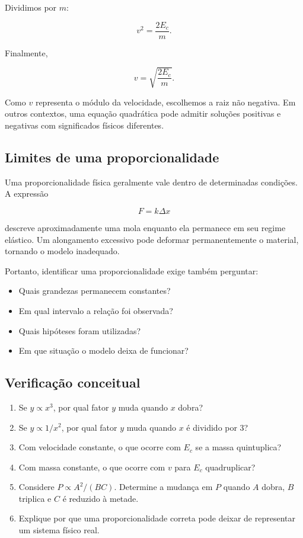 Dividimos por $m$:

\begin{equation}
  v^2=\frac{2E_c}{m}.
\end{equation}

Finalmente,

\begin{equation}
  v=\sqrt{\frac{2E_c}{m}}.
\end{equation}

Como $v$ representa o módulo da velocidade, escolhemos a raiz não negativa. Em outros contextos, uma equação quadrática pode admitir soluções positivas e negativas com significados físicos diferentes.

\subsection{Limites de uma proporcionalidade}

Uma proporcionalidade física geralmente vale dentro de determinadas condições. A expressão

\begin{equation}
  F=k\Delta x
\end{equation}

descreve aproximadamente uma mola enquanto ela permanece em seu regime elástico. Um alongamento excessivo pode deformar permanentemente o material, tornando o modelo inadequado.

Portanto, identificar uma proporcionalidade exige também perguntar:

\begin{itemize}
  \item Quais grandezas permanecem constantes?
  \item Em qual intervalo a relação foi observada?
  \item Quais hipóteses foram utilizadas?
  \item Em que situação o modelo deixa de funcionar?
\end{itemize}

\subsection*{Verificação conceitual}

\begin{enumerate}
  \item Se $y\propto x^3$, por qual fator $y$ muda quando $x$ dobra?
  \item Se $y\propto1/x^2$, por qual fator $y$ muda quando $x$ é dividido por 3?
  \item Com velocidade constante, o que ocorre com $E_c$ se a massa quintuplica?
  \item Com massa constante, o que ocorre com $v$ para $E_c$ quadruplicar?
  \item Considere $P\propto A^2/(BC)$. Determine a mudança em $P$ quando $A$ dobra, $B$ triplica e $C$ é reduzido à metade.
  \item Explique por que uma proporcionalidade correta pode deixar de representar um sistema físico real.
\end{enumerate}

